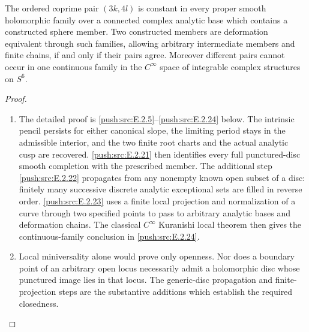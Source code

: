 \begin{corollary}\hypertarget{tag-033C}{}\label{push:src:E.2.4}

The ordered coprime pair $(3k,4l)$ is constant in every
proper smooth holomorphic family over a connected complex
analytic base which contains a constructed sphere member.
Two constructed members are deformation equivalent through
such families, allowing arbitrary intermediate members and
finite chains, if and only if their pairs agree.
Moreover different pairs cannot occur in one continuous
family in the $C^\infty$ space of integrable complex
structures on $S^6$.
\end{corollary}


\begin{proof}

\begin{enumerate}[label={$\langle1\rangle$\arabic*.},leftmargin=*]
\item The detailed proof is \ref{push:src:E.2.5}--\ref{push:src:E.2.24} below.  The intrinsic
pencil persists for either canonical slope, the limiting
period stays in the admissible interior, and the two finite
root charts and the actual analytic cusp are recovered.
\ref{push:src:E.2.21} then identifies every full punctured-disc smooth
completion with the prescribed member.  The additional
step \ref{push:src:E.2.22} propagates from any nonempty known open subset
of a disc: finitely many successive discrete analytic
exceptional sets are filled in reverse order.  \ref{push:src:E.2.23} uses
a finite local projection and normalization of a curve
through two specified points to pass to arbitrary analytic
bases and deformation chains.
The classical $C^\infty$ Kuranishi local theorem then
gives the continuous-family conclusion in \ref{push:src:E.2.24}.

\item Local miniversality alone would prove only openness.
Nor does a boundary point of an arbitrary open locus
necessarily admit a holomorphic disc whose punctured
image lies in that locus.  The generic-disc propagation
and finite-projection steps are the substantive additions
which establish the required closedness.

\end{enumerate}
\end{proof}